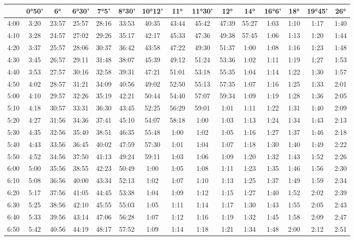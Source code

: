 \begin{footnotesize}\begin{tabular}{c | c | c | c | c | c | c | c | c | c | c | c | c | c | c}
		\space&0°50'&6°&6°30'&7°5'&8°30'&10°12'&11°&11°30'&12°&14°&16°6'&18°&19°45'&26°\\\hline
		4:00&3:20&23:57&25:57&28:16&33:53&40:35&43:44&45:42&47:39&55:27&1:03&1:10&1:17&1:40\\\hline
		4:10&3:28&24:57&27:02&29:26&35:17&42:17&45:33&47:36&49:38&57:45&1:06&1:13&1:20&1:44\\\hline
		4:20&3:37&25:57&28:06&30:37&36:42&43:58&47:22&49:30&51:37&1:00&1:08&1:16&1:23&1:48\\\hline
		4:30&3:45&26:57&29:11&31:48&38:07&45:39&49:12&51:24&53:36&1:02&1:11&1:19&1:27&1:53\\\hline
		4:40&3:53&27:57&30:16&32:58&39:31&47:21&51:01&53:18&55:35&1:04&1:14&1:22&1:30&1:57\\\hline
		4:50&4:02&28:57&31:21&34:09&40:56&49:02&52:50&55:13&57:35&1:07&1:16&1:25&1:33&2:01\\\hline
		5:00&4:10&29:57&32:26&35:19&42:21&50:44&54:40&57:07&59:34&1:09&1:19&1:28&1:36&2:05\\\hline
		5:10&4:18&30:57&33:31&36:30&43:45&52:25&56:29&59:01&1:01&1:11&1:22&1:31&1:40&2:09\\\hline
		5:20&4:27&31:56&34:36&37:41&45:10&54:07&58:18&1:00&1:03&1:13&1:24&1:34&1:43&2:13\\\hline
		5:30&4:35&32:56&35:40&38:51&46:35&55:48&1:00&1:02&1:05&1:16&1:27&1:37&1:46&2:18\\\hline
		5:40&4:43&33:56&36:45&40:02&47:59&57:30&1:01&1:04&1:07&1:18&1:30&1:40&1:49&2:22\\\hline
		5:50&4:52&34:56&37:50&41:13&49:24&59:11&1:03&1:06&1:09&1:20&1:32&1:43&1:52&2:26\\\hline
		6:00&5:00&35:56&38:55&42:23&50:49&1:00&1:05&1:08&1:11&1:23&1:35&1:46&1:56&2:30\\\hline
		6:10&5:08&36:56&40:00&43:34&52:13&1:02&1:07&1:10&1:13&1:25&1:37&1:49&1:59&2:34\\\hline
		6:20&5:17&37:56&41:05&44:45&53:38&1:04&1:09&1:12&1:15&1:27&1:40&1:52&2:02&2:39\\\hline
		6:30&5:25&38:56&42:10&45:55&55:03&1:05&1:11&1:14&1:17&1:30&1:43&1:55&2:05&2:43\\\hline
		6:40&5:33&39:56&43:14&47:06&56:28&1:07&1:12&1:16&1:19&1:32&1:45&1:58&2:09&2:47\\\hline
		6:50&5:42&40:56&44:19&48:17&57:52&1:09&1:14&1:18&1:21&1:34&1:48&2:00&2:12&2:51\\\hline

\end{tabular}
\end{footnotesize}
